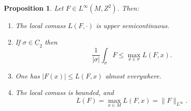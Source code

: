\documentclass[reqno,11pt]{amsart}
\newcommand*\dif{\mathop{}\!\mathrm{d}}
\newcommand{\Chain}{\underline C}
\newtheorem{proposition}[theorem]{Proposition}
\theoremstyle{definition}
\numberwithin{equation}{section}
\begin{document}
\begin{proposition}\label{crandall}
Let $F \in L^\infty(M, Z^2)$. Then:
\begin{enumerate}
\item The local comass $L(F, \cdot)$ is upper semicontinuous. \label{crandall usc}
\item If $\sigma \in \Chain_2$ then \label{crandall best curl is ABC}
$$\frac{1}{|\sigma|} \int_\sigma F \leq \max_{x \in \sigma} L(F, x).$$
\item One has $|F(x)| \leq L(F, x)$ almost everywhere. \label{crandall LDT}
\item The local comass is bounded, and \label{crandall linfinity}
$$L(F) = \max_{x \in M} L(F, x) = \|F\|_{L^\infty}.$$
\end{enumerate}
\end{proposition}
\end{document}
